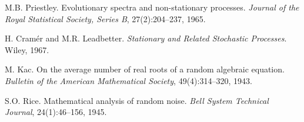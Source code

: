 \documentclass{article}
\newcommand{\tmem}[1]{{\em #1\/}}
\begin{document}
\begin{thebibliography}{99}
  {}M.B. Priestley. Evolutionary spectra and
  non-stationary processes. {\tmem{Journal of the Royal Statistical Society,
  Series B}}, 27(2):204--237, 1965.
  
  {}H. Cram{\'e}r and M.R. Leadbetter. {\tmem{Stationary
  and Related Stochastic Processes}}. Wiley, 1967.
  
  {}M. Kac. On the average number of real roots of a random
  algebraic equation. {\tmem{Bulletin of the American Mathematical Society}},
  49(4):314--320, 1943.
  
  {}S.O. Rice. Mathematical analysis of random noise.
  {\tmem{Bell System Technical Journal}}, 24(1):46--156, 1945.
\end{thebibliography}
\end{document}
